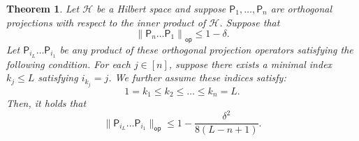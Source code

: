 \documentclass[10pt,a4paper]{amsart}
\newtheorem{theorem}{Theorem}[section]
\begin{document}
\begin{theorem}
\label{thm:gen_gap_2}
        Let $\mathcal{H}$ be a Hilbert space and suppose $\mathsf{P}_1,\ldots, \mathsf{P}_n$ are orthogonal projections with respect to the inner product of $\mathcal{H}$. Suppose that
        \begin{equation}
    \left\|\mathsf{P}_n\ldots \mathsf{P}_1\right\|_{\mathsf{op}}\leq 1-\delta.
\end{equation} 
Let $\mathsf{P}_{i_L}\ldots \mathsf{P}_{i_1}$ be any product of these orthogonal projection operators satisfying the following condition. For each $j\in [n]$, suppose there exists a minimal index $k_j\leq L$ satisfying $i_{k_j}=j$. We further assume these indices satisfy:
\begin{equation}
\label{eq:order_2}
        1=k_1\leq k_2\leq\ldots\leq k_n=L.
\end{equation}
Then, it holds that
\begin{equation*}
    \|\mathsf{P}_{i_L}\ldots \mathsf{P}_{i_1}\|_{\mathsf{op}}\leq 1-\frac{\delta^2}{8(L-n+1)}.
\end{equation*}
\end{theorem}
\end{document}
